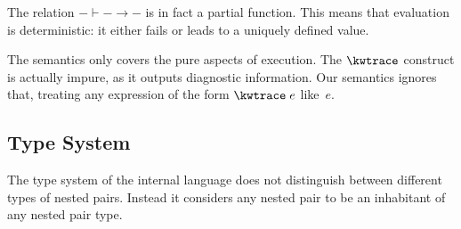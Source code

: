 \documentclass{scrartcl}
\newcommand{\extrace}[1]{\kwtrace \; #1}
\begin{document}
The relation ${−} ⊢ {−} → {−}$ is in fact a partial function. This means
that evaluation is deterministic: it either fails or leads to a uniquely
defined value.

The semantics only covers the pure aspects of execution. The $\kwtrace$
construct is actually impure, as it outputs diagnostic information. Our
semantics ignores that, treating any expression of the form
$\extrace{e}$ like~$e$.

\subsection{Type System}

The type system of the internal language does not distinguish between
different types of nested pairs. Instead it considers any nested pair to
be an inhabitant of any nested pair type.
\end{document}

